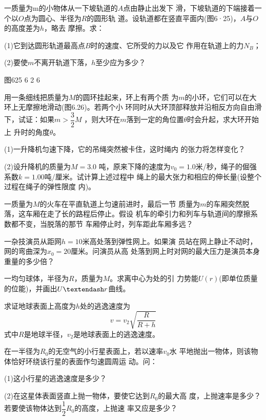 \begin{exercises}
\exercise 一质量为m的小物体从一下坡轨道的$ A $点由静止出发下
滑，下坡轨道的下端接着一个以$ O $点为圆心、半径为$ R $的圆形轨
道。设轨道都在竖直平面内(图6·25)，$ A $与$ O $的高度差为$ h $，略去
摩擦。求：

(1)它到达圆形轨道最高点$ B $时的速度、它所受的力以及它
作用在轨道上的力$ N _ { B } $；

(2)要使$ m $不离开轨道下落，$ h $至少应为多少？

图625 6 2 6

\exercise 用一条细线把质量为$ M $的圆环挂起来，环上有两个质
为$ m $的小环，它们可以在大环上无摩擦地滑动(图6.26)。若两个小
环同时从大环顶部释放并沿相反方向自由滑下，试证：如果$ m >
\dfrac { 3 } { 2 } M $
，则大环在$ m $落到一定的角位置$ \theta $时会升起，求大环开始上
升时的角度$ \theta $。

\exercise (1)一升降机匀速下降，它的吊绳突然被卡住，这时绳内
的张力将怎样变化？

(2)设升降机的质量为$ M = 3.0 $ 吨，原来下降的速度为$ v _ { 0 } =
1.0 $米/秒，绳子的倔强系数$ k = 1.00 $吨/厘米。试计算上述过程中
绳上的最大张力和相应的伸长量(设整个过程在绳子的弹性限度
内)。

\exercise 一质量为$ M $的火车在平直轨道上匀速前进时，最后一节
质量为$ m $的车厢突然脱落，这车厢在走了长的路程后停止。假设
机车的牵引力和列车与轨道间的摩擦系数都不变，当脱落的那节
车厢停止时，列车距此车厢多远？

\exercise 一杂技演员从距网$ h = 1 0 $米高处落到弹性网上。如果演
员站在网上静止不动时，网的弯曲深为$ x _ { 0 } = 2 0 $厘米。问演员从高
处落到网上时对网的最大压力是演员本身重量的多少倍？

\exercise 一均匀球体，半径为$ R $，质量为$ M $。求离中心为处的引
力势能$ U(r) $(即单位质量的位能)，并画出$ U \textendash r $曲线。

\exercise 求证地球表面上高度为$ h $处的逃逸速度为
\begin{equation*}
 v = v _ { 2 } \sqrt { \frac { R } { R + h } }
\end{equation*}
式中$ R $是地球半径，$ v _ { 2 } $是地球表面上的逃逸速度。

\exercise 在一半径为$ R_0 $的无空气的小行星表面上，若以速率$ v_0 $水
平地抛出一物体，则该物体恰好环绕该行星的表面作匀速圆周运
动。问：

(1)这小行星的逃逸速度是多少？

(2)在这星体表面竖直上抛一物体，要使它达到$ R_0 $的最大高
度，上抛速率是多少？若要使该物体达到$
\dfrac { 1 } { 2 } R_0 $的高度，上抛速
率又应是多少？


\end{exercises}
